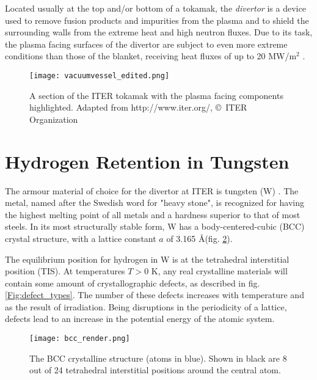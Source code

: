 Located usually at the top and/or bottom of a tokamak, the \textit{divertor} is a device used to remove fusion products and impurities from the plasma and to shield the surrounding walls from the extreme heat and high neutron fluxes. 
Due to its task, the plasma facing surfaces of the divertor are subject to even more extreme conditions than those of the blanket, receiving heat fluxes of up to 20 MW/m$^2$ \cite{Iter1234Divertor}. 

\begin{figure}[!ht]
\center
\texttt{[image: vacuumvessel\_edited.png]}
\caption{A section of the ITER tokamak with the plasma facing components highlighted. Adapted from http://www.iter.org/, \copyright~ITER Organization}
\label{fig:ITERslice}
\end{figure}

\section{Hydrogen Retention in Tungsten}
The armour material of choice for the divertor at ITER is tungsten (W) \cite{PITTS2013S48}.
The metal, named after the Swedish word for "heavy stone", is recognized for having the highest melting point of all metals and a hardness superior to that of most steels. 
In its most structurally stable form, W has a body-centered-cubic (BCC) crystal structure, with a lattice constant $a$ of 3.165 \AA (fig. \ref{Fig:bcc}).

The equilibrium position for hydrogen in W is at the tetrahedral interstitial position (TIS). 
At temperatures $T > 0$ K, any real crystalline materials will contain some amount of crystallographic defects, as described in fig. \ref{Fig:defect_types}. 
The number of these defects increases with temperature and as the result of irradiation. 
Being disruptions in the periodicity of a lattice, defects lead to an increase in the potential energy of the atomic system. 

\begin{figure}[!ht]
\center
\texttt{[image: bcc\_render.png]}
\caption{The BCC crystalline structure (atoms in blue). Shown in black are 8 out of 24 tetrahedral interstitial positions around the central atom.}
\label{Fig:bcc}
\end{figure}

